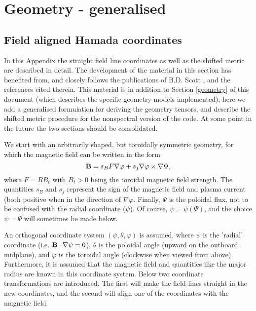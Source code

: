 \chapter{Geometry - generalised}

\section{Field aligned Hamada coordinates} 
\label{sec:hamada}
In this Appendix the straight field line coordinates as well as the shifted metric are 
described in detail. 
The development of the material in this section has benefited from, and closely follows the 
publications of B.D. Scott \cite{SCO98,SCO01}, and the references cited therein. 
This material is in addition to Section \ref{geometry} of this document (which describes the specific geometry models implemented); here we add
a generalised formulation for deriving the geometry tensors, and describe the shifted metric procedure for the nonspectral version of the code.
At some point in the future the two sections should be consolidated.

We start with an arbitrarily shaped, but toroidally symmetric geometry, for which the magnetic 
field can be written in the form 
\begin{equation}
{\bf B} = s_B F \nabla \varphi + s_j \nabla \varphi \times \nabla \Psi,
\end{equation}
where $F = RB_t$ with $B_t > 0$ being the toroidal magnetic field strength. The quantities 
$s_B$ and $s_j$ represent the sign of the magnetic field and plasma current (both positive 
when in the direction of $\nabla \varphi$. Finally, $\Psi$ is the poloidal flux, not to 
be confused with the radial coordinate ($\psi$). Of course, $\psi = \psi(\Psi)$, and the 
choice $\psi = \Psi$ will sometimes be made below. 
 
An orthogonal coordinate system $(\psi,\theta,\varphi)$ is assumed, where $\psi$ is the 'radial'
coordinate (i.e. ${\bf B}\cdot \nabla \psi = 0$), $\theta$ is the poloidal angle (upward 
on the outboard midplane), and $\varphi$ is the toroidal angle (clockwise when viewed from 
above). 
Furthermore, it is assumed that the magnetic field and quantities like the major radius are 
known in this coordinate system. 
Below two coordinate transformations are introduced. 
The first will make the field lines straight in the new coordinates, and the second will 
align one of the coordinates with the magnetic field. 

